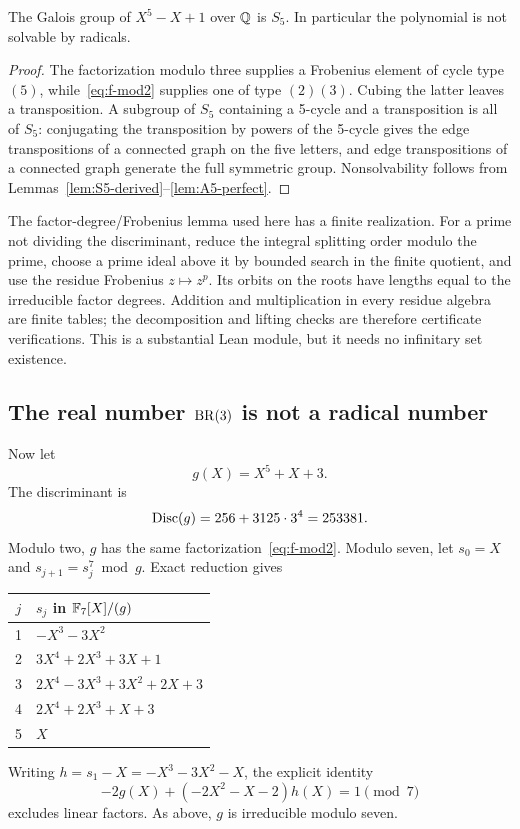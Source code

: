 \begin{theorem}\label{thm:x5-x+1-S5}
The Galois group of \(X^5-X+1\) over \(\mathbb Q\) is \(S_5\).  In particular the
polynomial is not solvable by radicals.
\end{theorem}

\begin{proof}
The factorization modulo three supplies a Frobenius element of cycle type
\((5)\), while~\eqref{eq:f-mod2} supplies one of type \((2)(3)\).  Cubing the
latter leaves a transposition.  A subgroup of \(S_5\) containing a 5-cycle and
a transposition is all of \(S_5\): conjugating the transposition by powers of
the 5-cycle gives the edge transpositions of a connected graph on the five
letters, and edge transpositions of a connected graph generate the full
symmetric group.  Nonsolvability follows from
Lemmas~\ref{lem:S5-derived}--\ref{lem:A5-perfect}.
\end{proof}

The factor-degree/Frobenius lemma used here has a finite \ipra{} realization.
For a prime not dividing the discriminant, reduce the integral splitting order
modulo the prime, choose a prime ideal above it by bounded search in the finite
quotient, and use the residue Frobenius \(z\mapsto z^p\).  Its orbits on the
roots have lengths equal to the irreducible factor degrees.  Addition and
multiplication in every residue algebra are finite tables; the decomposition
and lifting checks are therefore certificate verifications.  This is a
substantial Lean module, but it needs no infinitary set existence.

\subsection{The real number \(\operatorname{BR}(3)\) is not a radical number}

Now let
\[
 g(X)=X^5+X+3.
\]
The discriminant is
\[
 \operatorname{Disc}(g)=256+3125\cdot3^4=253381.
\]
Modulo two, \(g\) has the same factorization~\eqref{eq:f-mod2}.  Modulo seven,
let \(s_0=X\) and \(s_{j+1}=s_j^7\bmod g\).  Exact reduction gives
\begin{center}
\begin{tabular}{c|l}
\toprule
\(j\)&\(s_j\) in \(\mathbb F_7[X]/(g)\)\\
\midrule
1&\(-X^3-3X^2\)\\
2&\(3X^4+2X^3+3X+1\)\\
3&\(2X^4-3X^3+3X^2+2X+3\)\\
4&\(2X^4+2X^3+X+3\)\\
5&\(X\)\\
\bottomrule
\end{tabular}
\end{center}
Writing \(h=s_1-X=-X^3-3X^2-X\), the explicit identity
\begin{equation}\label{eq:g-bezout7}
 -2g(X)+(-2X^2-X-2)h(X)=1\pmod7
\end{equation}
excludes linear factors.  As above, \(g\) is irreducible modulo seven.

